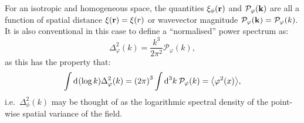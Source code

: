 For an isotropic and homogeneous space, the quantities \(\xi_\phi(\vr)\) and \(\mathcal{P}_\varphi(\vk)\) are all a function of spatial distance \({\xi(\vr) = \xi(r)}\) or wavevector magnitude \({\mathcal{P}_\varphi(\vk) = \mathcal{P}_\varphi(k)}\).
It is also conventional in this case to define a ``normalised'' power spectrum as:
\begin{equation}
  \Delta_\varphi^2(k) = \frac{k^3}{2\pi^2} \mathcal{P}_\varphi(k),
\end{equation}
as this has the property that:
\begin{equation}
  \int \d{(\log k)} \Delta_\varphi^2(k) = {\left( 2\pi \right)}^3\int\d[3]{k}\: \mathcal{P}_\varphi(k) = \mean{\varphi^2(x)},
\end{equation}
i.e.\ \(\Delta_\phi^2(k)\) may be thought of as the logarithmic spectral density of the point-wise spatial variance of the field.


